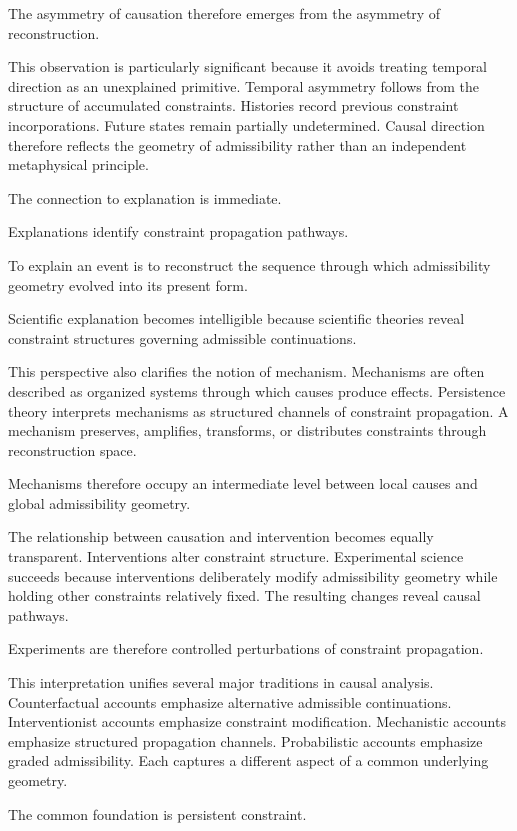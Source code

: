 \documentclass[12pt,oneside]{article}
\theoremstyle{definition}
\begin{document}
The asymmetry of causation therefore emerges from the asymmetry of reconstruction.

This observation is particularly significant because it avoids treating temporal direction as an unexplained primitive. Temporal asymmetry follows from the structure of accumulated constraints. Histories record previous constraint incorporations. Future states remain partially undetermined. Causal direction therefore reflects the geometry of admissibility rather than an independent metaphysical principle.

The connection to explanation is immediate.

Explanations identify constraint propagation pathways.

To explain an event is to reconstruct the sequence through which admissibility geometry evolved into its present form.

Scientific explanation becomes intelligible because scientific theories reveal constraint structures governing admissible continuations.

This perspective also clarifies the notion of mechanism. Mechanisms are often described as organized systems through which causes produce effects. Persistence theory interprets mechanisms as structured channels of constraint propagation. A mechanism preserves, amplifies, transforms, or distributes constraints through reconstruction space.

Mechanisms therefore occupy an intermediate level between local causes and global admissibility geometry.

The relationship between causation and intervention becomes equally transparent. Interventions alter constraint structure. Experimental science succeeds because interventions deliberately modify admissibility geometry while holding other constraints relatively fixed. The resulting changes reveal causal pathways.

Experiments are therefore controlled perturbations of constraint propagation.

This interpretation unifies several major traditions in causal analysis. Counterfactual accounts emphasize alternative admissible continuations. Interventionist accounts emphasize constraint modification. Mechanistic accounts emphasize structured propagation channels. Probabilistic accounts emphasize graded admissibility. Each captures a different aspect of a common underlying geometry.

The common foundation is persistent constraint.
\end{document}
